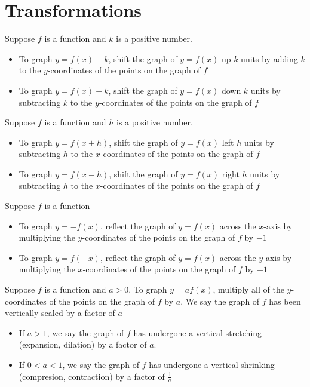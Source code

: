 \section{Transformations}

\begin{definition}
    Suppose $f$ is a function and $k$ is a positive number.
    \begin{itemize}
        \item To graph $y=f(x) + k$, shift the graph of $y=f(x)$ up $k$ units by adding $k$ to the $y$-coordinates of the points on the graph of $f$
        \item To graph $y=f(x) + k$, shift the graph of $y=f(x)$ down $k$ units by subtracting $k$ to the $y$-coordinates of the points on the graph of $f$
    \end{itemize}
\end{definition}

\begin{definition}
    Suppose $f$ is a function and $h$ is a positive number.
    \begin{itemize}
        \item To graph $y=f(x + h)$, shift the graph of $y=f(x)$ left $h$ units by subtracting $h$ to the $x$-coordinates of the points on the graph of $f$
        \item To graph $y=f(x - h)$, shift the graph of $y=f(x)$ right $h$ units by subtracting $h$ to the $x$-coordinates of the points on the graph of $f$
    \end{itemize}
\end{definition}

\begin{definition}[Reflections]
    Suppose $f$ is a function
    \begin{itemize}
        \item To graph $y=-f(x)$, reflect the graph of $y=f(x)$ across the $x$-axis by multiplying the $y$-coordinates of the points on the graph of $f$ by $-1$
        \item To graph $y=f(-x)$, reflect the graph of $y=f(x)$ across the $y$-axis by multiplying the $x$-coordinates of the points on the graph of $f$ by $-1$
    \end{itemize}
\end{definition}

\begin{definition}
    Suppose $f$ is a function and $a>0$. To graph $y=af(x)$, multiply all of the $y$-coordinates of the points on the graph of $f$ by $a$. We say the graph of $f$ has been vertically scaled by a factor of $a$
    \begin{itemize}
        \item If $a>1$, we say the graph of $f$ has undergone a vertical stretching (expansion, dilation) by a factor of $a$.
        \item If $0 <a<1$, we say the graph of $f$ has undergone a vertical shrinking (compresion, contraction) by a factor of $\frac{1}{a}$
    \end{itemize}
\end{definition}

